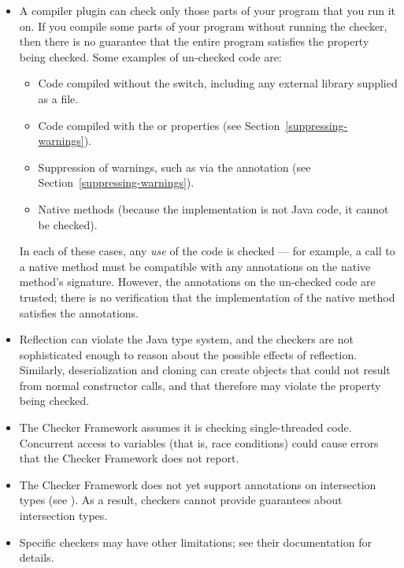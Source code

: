 \begin{itemize}

\item
  A compiler plugin can check only those parts of your program that you run
  it on.  If you compile some parts of your program without running the
  checker, then there is no guarantee that the entire program satisfies the
  property being checked.  Some examples of un-checked code are:

  \begin{itemize}
  \item
    Code compiled without the  switch, including any
    external library supplied as a  file.
  \item
    Code compiled with the  or 
    properties (see Section~\ref{suppressing-warnings}).
  \item
    Suppression of warnings, such as via the 
    annotation (see Section~\ref{suppressing-warnings}).
  \item
    Native methods (because the implementation is not Java code, it cannot
    be checked).
  \end{itemize}

  In each of these cases, any \emph{use} of the code is checked --- for
  example, a call to a native method must be compatible with any
  annotations on the native method's signature.
  However, the annotations on the un-checked code are trusted; there is no
  verification that the implementation of the native method satisfies the
  annotations.

\item
  Reflection can violate the Java type system, and
  the checkers are not sophisticated enough to reason about the possible
  effects of reflection.  Similarly, deserialization and cloning can
  create objects that could not result from normal constructor calls, and
  that therefore may violate the property being checked.

\item
  The Checker Framework assumes it is checking single-threaded code.
  Concurrent access to variables (that is, race conditions) could cause
  errors that the Checker Framework does not report.

\item
  The Checker Framework does not yet support annotations on intersection
  types (see
  ).  As a result, checkers cannot provide guarantees about
  intersection types.

\item
  Specific checkers may have other limitations; see their documentation for
  details.

\end{itemize}

